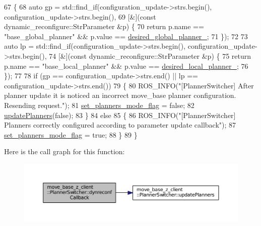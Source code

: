 \begin{DoxyCode}
67 \{
68   \textcolor{keyword}{auto} gp = std::find\_if(configuration\_update->strs.begin(), configuration\_update->strs.begin(),
69                          [&](\textcolor{keyword}{const} dynamic\_reconfigure::StrParameter &p) \{
70                            \textcolor{keywordflow}{return} p.name == \textcolor{stringliteral}{"base\_global\_planner"} && p.value == 
      \hyperlink{classmove__base__z__client_1_1PlannerSwitcher_a004c15858f0a6b9abcd8211d58a7e34c}{desired\_global\_planner\_};
71                          \});
72 
73   \textcolor{keyword}{auto} lp = std::find\_if(configuration\_update->strs.begin(), configuration\_update->strs.begin(),
74                          [&](\textcolor{keyword}{const} dynamic\_reconfigure::StrParameter &p) \{
75                            \textcolor{keywordflow}{return} p.name == \textcolor{stringliteral}{"base\_local\_planner"} && p.value == 
      \hyperlink{classmove__base__z__client_1_1PlannerSwitcher_ae47bd6c9c70b27cddcb394f26bb9372d}{desired\_local\_planner\_};
76                          \});
77 
78   \textcolor{keywordflow}{if} (gp == configuration\_update->strs.end() || lp == configuration\_update->strs.end())
79   \{
80     ROS\_INFO(\textcolor{stringliteral}{"[PlannerSwitcher] After planner update it is noticed an incorrect move\_base planner
       configuration. Resending request."});
81     \hyperlink{classmove__base__z__client_1_1PlannerSwitcher_a74c0b5c21064a868700288e759446ac5}{set\_planners\_mode\_flag} = \textcolor{keyword}{false};
82     \hyperlink{classmove__base__z__client_1_1PlannerSwitcher_a189ac8c027169a111c7d8e14d864752f}{updatePlanners}(\textcolor{keyword}{false});
83   \}
84   \textcolor{keywordflow}{else}
85   \{
86     ROS\_INFO(\textcolor{stringliteral}{"[PlannerSwitcher] Planners correctly configured according to parameter update callback"});
87     \hyperlink{classmove__base__z__client_1_1PlannerSwitcher_a74c0b5c21064a868700288e759446ac5}{set\_planners\_mode\_flag} = \textcolor{keyword}{true};
88   \}
89 \}
\end{DoxyCode}


Here is the call graph for this function\+:
\nopagebreak
\begin{figure}[H]
\begin{center}
\leavevmode
\includegraphics[width=350pt]{classmove__base__z__client_1_1PlannerSwitcher_a7eacfedc6b6ea404ee8fab062d62a911_cgraph}
\end{center}
\end{figure}




